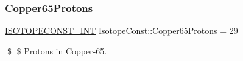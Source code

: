 \subsubsection{\texorpdfstring{Copper65\+Protons}{Copper65Protons}}
{\footnotesize\ttfamily \mbox{\hyperlink{group___isotope_const-_macros_ga5f18360b3e99483a35c32d789e62621c}{I\+S\+O\+T\+O\+P\+E\+C\+O\+N\+S\+T\+\_\+\+I\+NT}} Isotope\+Const\+::\+Copper65\+Protons = 29}

\$ \$ Protons in Copper-\/65. 